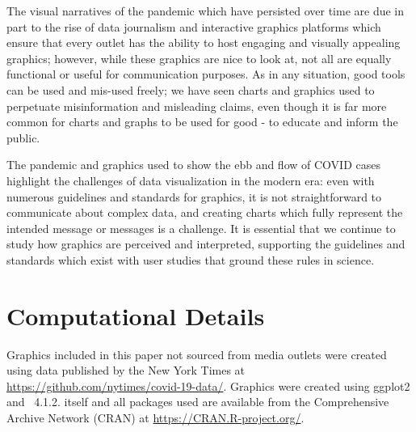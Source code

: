 \documentclass[article]{jdssv}\usepackage[]{graphicx}\usepackage[]{color}
\begin{document}
The visual narratives of the pandemic which have persisted over time are due in part to the rise of data journalism and interactive graphics platforms which ensure that every outlet has the ability to host engaging and visually appealing graphics; however, while these graphics are nice to look at, not all are equally functional or useful for communication purposes. As in any situation, good tools can be used and mis-used freely; we have seen charts and graphics used to perpetuate misinformation and misleading claims, even though it is far more common for charts and graphs to be used for good - to educate and inform the public.

The pandemic and graphics used to show the ebb and flow of COVID cases highlight the challenges of data visualization in the modern era: even with numerous guidelines and standards for graphics, it is not straightforward to communicate about complex data, and creating charts which fully represent the intended message or messages is a challenge. It is essential that we continue to study how graphics are perceived and interpreted, supporting the guidelines and standards which exist with user studies that ground these rules in science. 



\newpage
\section*{Computational Details}
Graphics included in this paper not sourced from media outlets were created using data published by the New York Times at \url{https://github.com/nytimes/covid-19-data/}. Graphics were created using ggplot2\citep{ggplot2} and ~4.1.2.  itself and all packages used are available from the Comprehensive  Archive Network (CRAN) at \url{https://CRAN.R-project.org/}.
\end{document}
